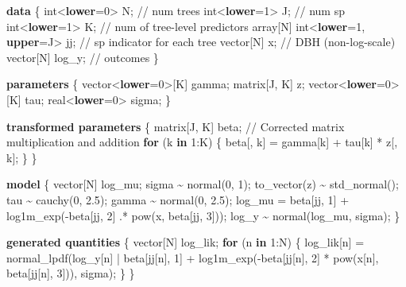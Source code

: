 \documentclass[
  12pt,
  letterpaper,
  DIV=11,
  numbers=noendperiod]{scrartcl}
\newenvironment{Shaded}{\begin{snugshade}}{\end{snugshade}}
\newcommand{\CommentTok}[1]{\textcolor[rgb]{0.37,0.37,0.37}{#1}}
\newcommand{\ControlFlowTok}[1]{\textcolor[rgb]{0.00,0.23,0.31}{\textbf{#1}}}
\newcommand{\DataTypeTok}[1]{\textcolor[rgb]{0.68,0.00,0.00}{#1}}
\newcommand{\DecValTok}[1]{\textcolor[rgb]{0.68,0.00,0.00}{#1}}
\newcommand{\FloatTok}[1]{\textcolor[rgb]{0.68,0.00,0.00}{#1}}
\newcommand{\KeywordTok}[1]{\textcolor[rgb]{0.00,0.23,0.31}{\textbf{#1}}}
\newcommand{\NormalTok}[1]{\textcolor[rgb]{0.00,0.23,0.31}{#1}}
\begin{document}
\begin{Shaded}
\begin{Highlighting}[]
\KeywordTok{data}\NormalTok{ \{}
  \DataTypeTok{int}\NormalTok{\textless{}}\KeywordTok{lower}\NormalTok{=}\DecValTok{0}\NormalTok{\textgreater{} N;                    }\CommentTok{// num trees}
  \DataTypeTok{int}\NormalTok{\textless{}}\KeywordTok{lower}\NormalTok{=}\DecValTok{1}\NormalTok{\textgreater{} J;                    }\CommentTok{// num sp}
  \DataTypeTok{int}\NormalTok{\textless{}}\KeywordTok{lower}\NormalTok{=}\DecValTok{1}\NormalTok{\textgreater{} K;                    }\CommentTok{// num of tree{-}level predictors}
  \DataTypeTok{array}\NormalTok{[N] }\DataTypeTok{int}\NormalTok{\textless{}}\KeywordTok{lower}\NormalTok{=}\DecValTok{1}\NormalTok{, }\KeywordTok{upper}\NormalTok{=J\textgreater{} jj; }\CommentTok{// sp indicator for each tree}
  \DataTypeTok{vector}\NormalTok{[N] x;                       }\CommentTok{// DBH (non{-}log{-}scale)}
  \DataTypeTok{vector}\NormalTok{[N] log\_y;                   }\CommentTok{// outcomes}
\NormalTok{\}}

\KeywordTok{parameters}\NormalTok{ \{}
  \DataTypeTok{vector}\NormalTok{\textless{}}\KeywordTok{lower}\NormalTok{=}\DecValTok{0}\NormalTok{\textgreater{}[K] gamma;}
  \DataTypeTok{matrix}\NormalTok{[J, K] z;}
  \DataTypeTok{vector}\NormalTok{\textless{}}\KeywordTok{lower}\NormalTok{=}\DecValTok{0}\NormalTok{\textgreater{}[K] tau;}
  \DataTypeTok{real}\NormalTok{\textless{}}\KeywordTok{lower}\NormalTok{=}\DecValTok{0}\NormalTok{\textgreater{} sigma;}
\NormalTok{\}}

\KeywordTok{transformed parameters}\NormalTok{ \{}
  \DataTypeTok{matrix}\NormalTok{[J, K] beta;}
  \CommentTok{// Corrected matrix multiplication and addition}
  \ControlFlowTok{for}\NormalTok{ (k }\ControlFlowTok{in} \DecValTok{1}\NormalTok{:K) \{}
\NormalTok{    beta[, k] =  gamma[k] + tau[k] * z[, k];}
\NormalTok{  \}}
\NormalTok{\}}

\KeywordTok{model}\NormalTok{ \{}
  \DataTypeTok{vector}\NormalTok{[N] log\_mu;}
\NormalTok{  sigma \textasciitilde{} normal(}\DecValTok{0}\NormalTok{, }\DecValTok{1}\NormalTok{);}
\NormalTok{  to\_vector(z) \textasciitilde{} std\_normal();}
\NormalTok{  tau \textasciitilde{} cauchy(}\DecValTok{0}\NormalTok{, }\FloatTok{2.5}\NormalTok{);}
\NormalTok{  gamma \textasciitilde{} normal(}\DecValTok{0}\NormalTok{, }\FloatTok{2.5}\NormalTok{);}
\NormalTok{  log\_mu = beta[jj, }\DecValTok{1}\NormalTok{] + log1m\_exp({-}beta[jj, }\DecValTok{2}\NormalTok{] .* pow(x, beta[jj, }\DecValTok{3}\NormalTok{]));}
\NormalTok{  log\_y \textasciitilde{} normal(log\_mu, sigma);}
\NormalTok{\}}

\KeywordTok{generated quantities}\NormalTok{ \{}
  \DataTypeTok{vector}\NormalTok{[N] log\_lik;}
  \ControlFlowTok{for}\NormalTok{ (n }\ControlFlowTok{in} \DecValTok{1}\NormalTok{:N) \{}
\NormalTok{    log\_lik[n] = normal\_lpdf(log\_y[n] |}
\NormalTok{      beta[jj[n], }\DecValTok{1}\NormalTok{] + log1m\_exp({-}beta[jj[n], }\DecValTok{2}\NormalTok{] * pow(x[n], beta[jj[n], }\DecValTok{3}\NormalTok{])),}
\NormalTok{      sigma);}
\NormalTok{  \}}
\NormalTok{\}}
\end{Highlighting}
\end{Shaded}
\end{document}
